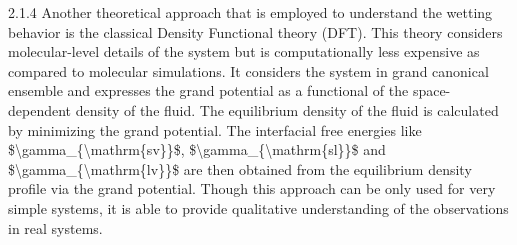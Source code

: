 \par 2.1.4 Another theoretical approach that is employed to understand the wetting behavior is the classical Density Functional theory (DFT). This theory considers molecular-level details of the system but is computationally less expensive as compared to molecular simulations. It considers the system in grand canonical ensemble and expresses the grand potential as a functional of the space-dependent density of the fluid. The equilibrium density of the fluid is calculated by minimizing the grand potential. The interfacial free energies like \$\textbackslash gamma\_\{\textbackslash mathrm\{sv\}\}\$,  \$\textbackslash gamma\_\{\textbackslash mathrm\{sl\}\}\$ and \$\textbackslash gamma\_\{\textbackslash mathrm\{lv\}\}\$ are then obtained from the equilibrium density profile via the grand potential. Though this approach can be only used for very simple systems, it is able to provide qualitative understanding of the observations in real systems.
